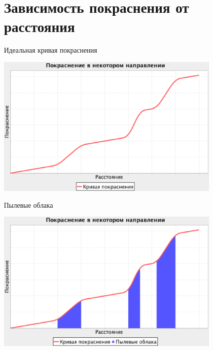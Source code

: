 \documentclass[14pt, fleqn, xcolor={dvipsnames, table}]{beamer}
\begin{document}
    \section{Зависимость покраснения от расстояния}     
    
        \begin{frame}{Идеальная кривая покраснения}
            \begin{center}
                \includegraphics[width=11cm]{ideal-1-no-tick.eps}
            \end{center}             
        \end{frame}
        
        \begin{frame}{Пылевые облака}
            \begin{center}
                \includegraphics[width=11cm]{ideal-2-no-tick.eps}
            \end{center}             
        \end{frame}
        
\end{document}
